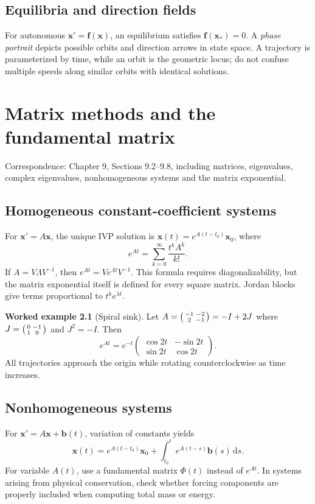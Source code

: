 \documentclass[11pt,letterpaper,oneside]{report}
\theoremstyle{definition}\newtheorem{definition}[theorem]{Definition}
\newtheorem{example}[theorem]{Worked example}
\theoremstyle{remark}\newtheorem{remark}[theorem]{Remark}
\newcommand{\dd}{\,\mathrm{d}}
\begin{document}
\section{Equilibria and direction fields}
For autonomous $\mathbf x'=\mathbf f(\mathbf x)$, an equilibrium satisfies $\mathbf f(\mathbf x_*)=0$. A \emph{phase portrait} depicts possible orbits and direction arrows in state space. A trajectory is parameterized by time, while an orbit is the geometric locus; do not confuse multiple speeds along similar orbits with identical solutions.
\chapter{Matrix methods and the fundamental matrix}
\begin{bookground}Correspondence: Chapter 9, Sections 9.2--9.8, including matrices, eigenvalues, complex eigenvalues, nonhomogeneous systems and the matrix exponential.\end{bookground}
\section{Homogeneous constant-coefficient systems}
For $\mathbf x'=A\mathbf x$, the unique IVP solution is $\mathbf x(t)=e^{A(t-t_0)}\mathbf x_0$, where
\[e^{At}=\sum_{k=0}^{\infty}\frac{t^kA^k}{k!}.\]
If $A=V\Lambda V^{-1}$, then $e^{At}=Ve^{\Lambda t}V^{-1}$. This formula requires diagonalizability, but the matrix exponential itself is defined for every square matrix. Jordan blocks give terms proportional to $t^ke^{\lambda t}$.
\begin{example}[Spiral sink]
Let $A=\begin{psmallmatrix}-1&-2\\2&-1\end{psmallmatrix}=-I+2J$ where $J=\begin{psmallmatrix}0&-1\\1&0\end{psmallmatrix}$ and $J^2=-I$. Then
\[e^{At}=e^{-t}\begin{pmatrix}\cos2t&-\sin2t\\\sin2t&\cos2t\end{pmatrix}.\]
All trajectories approach the origin while rotating counterclockwise as time increases.
\end{example}
\section{Nonhomogeneous systems}
For $\mathbf x'=A\mathbf x+\mathbf b(t)$, variation of constants yields
\[\mathbf x(t)=e^{A(t-t_0)}\mathbf x_0+\int_{t_0}^t e^{A(t-s)}\mathbf b(s)\dd s.\]
For variable $A(t)$, use a fundamental matrix $\Phi(t)$ instead of $e^{At}$. In systems arising from physical conservation, check whether forcing components are properly included when computing total mass or energy.
\end{document}
